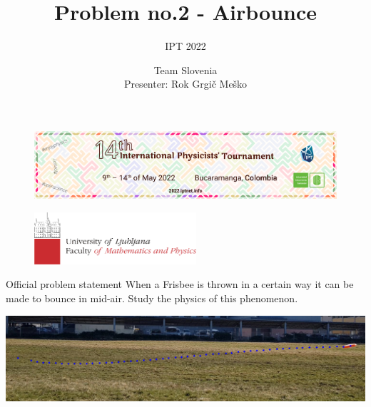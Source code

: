 \documentclass{beamer}
\title[2. Airbounce]{Problem no.2 - Airbounce}
\subtitle{IPT 2022}
\author[University of Ljubljana]{Team Slovenia \\ Presenter: Rok Grgi\v c Me\v sko}
\date{\vspace{-5ex}}
\begin{document}
\begin{frame}

\begin{figure}[H]
	\centering
	  \includegraphics[width=\textwidth]{naslovnica_ipt.png}
\end{figure}

\titlepage %

\vspace{-13mm}
\begin{figure}[H]
	\flushleft
	  \includegraphics[width=6cm]{fmf_logo.png}
\end{figure}

\end{frame}





\begin{frame}

\begin{block}{Official problem statement}
When a Frisbee is thrown in a certain way it can be made to bounce in mid-air. Study the physics of this phenomenon.
\end{block}
\includegraphics[width=\textwidth]{primer_meta.png}

\end{frame}

\end{document}
